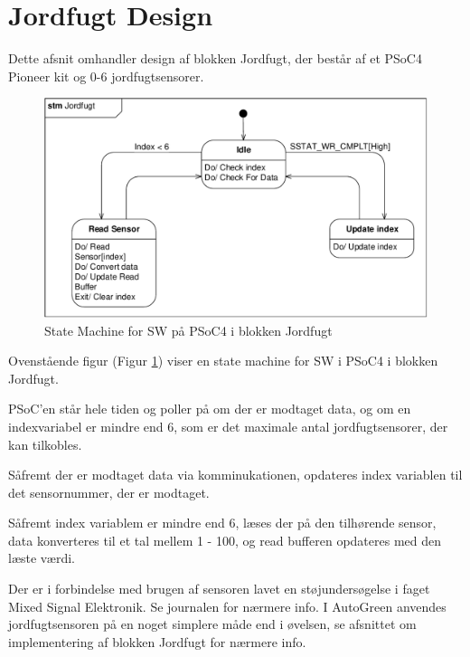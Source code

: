 \section{Jordfugt Design} \label{sec:Jordfugt_Design}

Dette afsnit omhandler design af blokken Jordfugt, der består af et PSoC4 Pioneer kit og 0-6 jordfugtsensorer. 

\begin{figure}[h]
\centering 
\includegraphics[width={\textwidth}, trim=0 0 0 0, clip=true] {../fig/stm_jordfugt.pdf}
\caption{State Machine for SW på PSoC4 i blokken Jordfugt}
\label{fig:stm_jordfugt}
\end{figure}

Ovenstående figur (Figur \ref{fig:stm_jordfugt}) viser en state machine for SW i PSoC4 i blokken Jordfugt.
 
PSoC'en står hele tiden og poller på om der er modtaget data, og om en indexvariabel er mindre end 6, som er det maximale antal jordfugtsensorer, der kan tilkobles.

Såfremt der er modtaget data via \IIC komminukationen, opdateres index variablen til det sensornummer, der er modtaget. 

Såfremt index variablem er mindre end 6, læses der på den tilhørende sensor, data konverteres til et tal mellem 1 - 100, og read bufferen opdateres med den læste værdi. 

\mbox{}

Der er i forbindelse med brugen af sensoren lavet en støjundersøgelse i faget Mixed Signal Elektronik. 
Se journalen \cite{lib:MSE_06} for nærmere info. 
I AutoGreen anvendes jordfugtsensoren på en noget simplere måde end i øvelsen, se afsnittet om implementering af blokken Jordfugt for nærmere info.

\clearpage